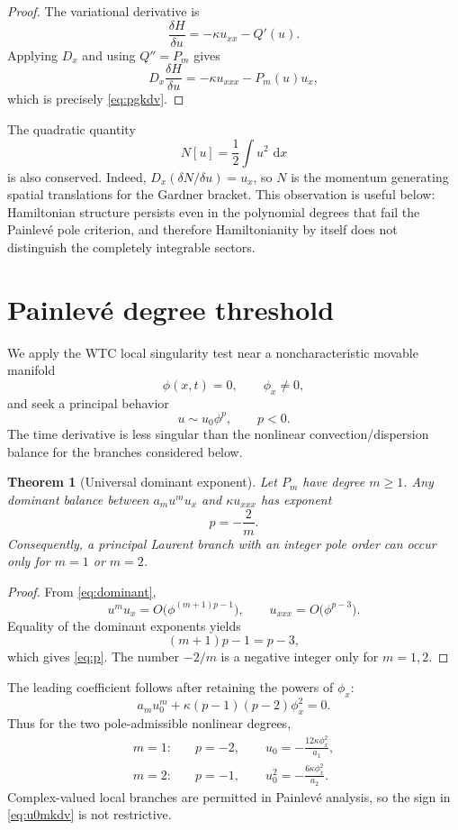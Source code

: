 \documentclass[11pt]{article}
\newtheorem{theorem}{Theorem}[section]
\newcommand{\dd}{\,\mathrm{d}}
\newcommand{\Dx}{D_x}
\begin{document}
\begin{proof}
The variational derivative is
\[
 \frac{\delta H}{\delta u}=-\kappa u_{xx}-Q'(u).
\]
Applying $D_x$ and using $Q''=P_m$ gives
\[
 \Dx\frac{\delta H}{\delta u}=-\kappa u_{xxx}-P_m(u)u_x,
\]
which is precisely \eqref{eq:pgkdv}.
\end{proof}

The quadratic quantity
\begin{equation}
 N[u]=\frac12\int u^2\,\dd x
 \label{eq:l2}
\end{equation}
is also conserved.  Indeed, $D_x(\delta N/\delta u)=u_x$, so $N$ is the momentum generating spatial translations for the Gardner bracket.  This observation is useful below: Hamiltonian structure persists even in the polynomial degrees that fail the Painlev\'e pole criterion, and therefore Hamiltonianity by itself does not distinguish the completely integrable sectors.

\section{Painlev\'e degree threshold}
We apply the WTC local singularity test near a noncharacteristic movable manifold
\[
 \phi(x,t)=0,\qquad \phi_x\ne0,
\]
and seek a principal behavior
\begin{equation}
 u\sim u_0\phi^p,\qquad p<0.
 \label{eq:dominant}
\end{equation}
The time derivative is less singular than the nonlinear convection/dispersion balance for the branches considered below.

\begin{theorem}[Universal dominant exponent]
Let $P_m$ have degree $m\ge1$.  Any dominant balance between $a_m u^m u_x$ and $\kappa u_{xxx}$ has exponent
\begin{equation}
 p=-\frac{2}{m}.
 \label{eq:p}
\end{equation}
Consequently, a principal Laurent branch with an integer pole order can occur only for $m=1$ or $m=2$.
\end{theorem}

\begin{proof}
From \eqref{eq:dominant},
\[
 u^m u_x=O\bigl(\phi^{(m+1)p-1}\bigr),
 \qquad
 u_{xxx}=O\bigl(\phi^{p-3}\bigr).
\]
Equality of the dominant exponents yields
\[
 (m+1)p-1=p-3,
\]
which gives \eqref{eq:p}.  The number $-2/m$ is a negative integer only for $m=1,2$.
\end{proof}

The leading coefficient follows after retaining the powers of $\phi_x$:
\begin{equation}
 a_m u_0^m+\kappa(p-1)(p-2)\phi_x^2=0.
 \label{eq:u0general}
\end{equation}
Thus for the two pole-admissible nonlinear degrees,
\begin{align}
 m=1:&\quad p=-2,\qquad u_0=-\frac{12\kappa\phi_x^2}{a_1},
 \label{eq:u0kdv}\\
 m=2:&\quad p=-1,\qquad u_0^2=-\frac{6\kappa\phi_x^2}{a_2}.
 \label{eq:u0mkdv}
\end{align}
Complex-valued local branches are permitted in Painlev\'e analysis, so the sign in \eqref{eq:u0mkdv} is not restrictive.
\end{document}
